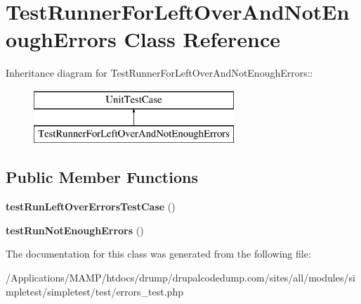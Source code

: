 \hypertarget{class_test_runner_for_left_over_and_not_enough_errors}{
\section{TestRunnerForLeftOverAndNotEnoughErrors Class Reference}
\label{class_test_runner_for_left_over_and_not_enough_errors}
}
Inheritance diagram for TestRunnerForLeftOverAndNotEnoughErrors::\begin{figure}[H]
\begin{center}
\leavevmode
\includegraphics[height=2cm]{class_test_runner_for_left_over_and_not_enough_errors}
\end{center}
\end{figure}
\subsection*{Public Member Functions}
\begin{DoxyCompactItemize}
\item 
\hypertarget{class_test_runner_for_left_over_and_not_enough_errors_a479cfb53565d438be362cc92335c600a}{
{\bfseries testRunLeftOverErrorsTestCase} ()}
\label{class_test_runner_for_left_over_and_not_enough_errors_a479cfb53565d438be362cc92335c600a}

\item 
\hypertarget{class_test_runner_for_left_over_and_not_enough_errors_abafbccbf65bcc98fa2a99b028b92074c}{
{\bfseries testRunNotEnoughErrors} ()}
\label{class_test_runner_for_left_over_and_not_enough_errors_abafbccbf65bcc98fa2a99b028b92074c}

\end{DoxyCompactItemize}


The documentation for this class was generated from the following file:\begin{DoxyCompactItemize}
\item 
/Applications/MAMP/htdocs/drump/drupalcodedump.com/sites/all/modules/simpletest/simpletest/test/errors\_\-test.php\end{DoxyCompactItemize}
